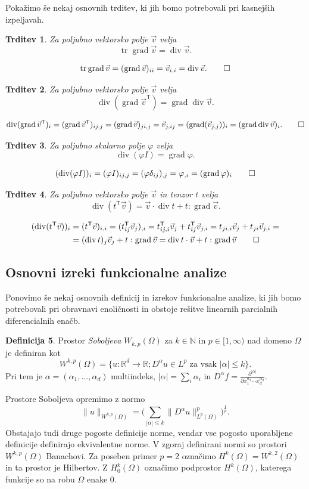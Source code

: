 \documentclass[a4paper,twoside]{article}
\theoremstyle{definition} %
\newtheorem{definicija}{Definicija}[section]
\theoremstyle{plain} %
\newtheorem{trditev}[definicija]{Trditev}
\numberwithin{equation}{section}
\newcommand{\R}{\mathbb R}
\newcommand{\N}{\mathbb N}
\newcommand{\T}{\mathsf{T}}
\renewcommand{\div}{\operatorname{div}}
\newcommand{\grad}{\operatorname{grad}}
\renewcommand{\phi}{\varphi}
\newcommand{\dpar}[2]{\ensuremath{\frac{\partial #1}{\partial #2}}}
\newcommand{\vv}{\vec{v}}
\DeclareMathOperator{\tr}{tr}
\begin{document}
Pokažimo še nekaj osnovnih trditev, ki jih bomo potrebovali pri kasnejših
izpeljavah.
\begin{trditev}
  Za poljubno vektorsko polje $\vv$ velja
  \[ \tr\grad \vv = \div \vv. \]
\end{trditev}
\proof
\[
  \tr\grad\vv = (\grad\vv)_{ii} = \vv_{i,i} = \div \vv. \qedhere
\]
\endproof
\begin{trditev}
  Za poljubno vektorsko polje $\vv$ velja
  \[ \div(\grad\vv^\T) = \grad\div \vv.  \]
\end{trditev}
\proof
\[
  \div(\grad \vv^\T)_i = (\grad\vv^\T)_{ij,j} = (\grad \vv)_{ji,j} = \vv_{j,ij}
  = (\grad(\vv_{j,j}))_i = (\grad\div \vv)_i. \qedhere
\]
\endproof
\begin{trditev}
  Za poljubno skalarno polje $\phi$ velja
  \[ \div(\phi I) = \grad \phi.  \]
\end{trditev}
\proof
\[
  (\div(\phi I))_i = (\phi I)_{ij,j} = (\phi \delta_{ij})_{,j} = \phi_{,i} =
  (\grad \phi)_i \qedhere
\]
\endproof
\begin{trditev}
  Za poljubno vektorsko polje $\vv$ in tenzor $t$ velja
  \label{trd:div-tv}
  \[
    \div(t^\T \vv) = \vv \cdot \div t + t : \grad\vv.
    \]
\end{trditev}
\proof
\begin{align*}
  (\div(t^\T \vv))_i &= (t^\T\vv)_{i,i} = (t^\T_{ij} \vv_j)_{,i} =
    t^\T_{ij,i} \vv_j + t^\T_{ij} \vv_{j,i} =
    t_{ji,i} \vv_j + t_{ji} \vv_{j,i} = \\
    &=  (\div t)_j \vv_j + t:\grad \vv = \div t \cdot \vv + t:\grad \vv\qedhere
\end{align*}
\endproof

\subsection{Osnovni izreki funkcionalne analize}

Ponovimo še nekaj osnovnih definicij in izrekov funkcionalne analize, ki jih
bomo potrebovali pri obravnavi enoličnosti in obstoje rešitve linearnih
parcialnih diferencialnih enačb.

\begin{definicija}
  Prostor \emph{Soboljeva} $W_{k,p}(\Omega)$ za $k \in \N$ in $p \in [1,
  \infty)$ nad domeno $\Omega$ je definiran kot
  \[
    W^{k,p}(\Omega) = \{u\colon\R^d\to\R; D^\alpha u \in L^p \text{ za vsak }
    |\alpha| \leq k \}.
  \]
  Pri tem je $\alpha = (\alpha_1, \dots, \alpha_d)$ multiindeks, $|\alpha| =
  \sum_i\alpha_i$ in $D^\alpha f = \dpar{^{|\alpha|}}{x_1^{\alpha_1}\cdots
  x_d^{\alpha_d}}$.
\end{definicija}
Prostore Soboljeva opremimo z normo
\[
\|u\|_{W^{k,p}(\Omega)} = \Big(\sum_{|\alpha| \leq k} \|D^\alpha
u\|_{L^p(\Omega)}^p\Big)^\frac1p.
\]
Obstajajo tudi druge pogoste definicije norme, vendar vse pogosto uporabljene
definicije definirajo ekvivalentne norme. V zgoraj definirani normi so prostori
$W^{k,p}(\Omega)$ Banachovi. Za poseben primer $p = 2$ označimo $H^k(\Omega) =
W^{k,2}(\Omega)$ in ta prostor je Hilbertov. Z $H^k_0(\Omega)$ označimo
podprostor $H^k(\Omega)$, katerega funkcije so na robu $\Omega$ enake 0.
\end{document}
